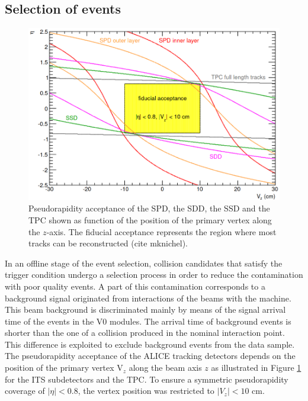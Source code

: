 \documentclass[12pt,a4paper]{report}
\begin{document}
\subsection{Selection of events}
\begin{figure}[tb!]
\centering
\includegraphics[width=12cm]{Plots/fiducialAcc.png}  
\caption{Pseudorapidity acceptance of the SPD, the SDD, the SSD and the TPC shown as function of the position of the primary vertex along the $z$-axis. The fiducial acceptance represents the region where most tracks can be reconstructed (cite mknichel).}
\label{fiducialAcc}
\end{figure}
In an offline stage of the event selection, collision candidates that satisfy the trigger condition undergo a selection process in order to reduce the contamination with poor quality events. A part of this contamination corresponds to a background signal originated from interactions of the beams with the machine. This beam background is discriminated mainly by means of the signal arrival time of the events in the V0 modules. The arrival time of background events is shorter than the one of a collision produced in the nominal interaction point. This difference is exploited to exclude background events from the data sample. \\
The pseudorapidity acceptance of the ALICE tracking detectors depends on the position of the primary vertex $\text{V}_z$ along the beam axis $z$ as illustrated in Figure \ref{fiducialAcc} for the ITS subdetectors and the TPC. To ensure a symmetric pseudorapidity coverage of $|\eta| < 0.8$, the vertex position was restricted to $|V_z| < 10$ cm.
\end{document}
